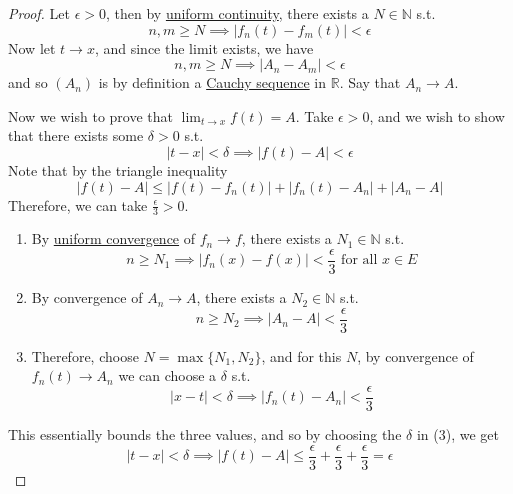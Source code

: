   \begin{proof}
    Let $\epsilon > 0$, then by \hyperref[def:uniform-continuity]{uniform continuity}, there exists a $N \in \mathbb{N}$ s.t. 
    \begin{equation}
      n, m \geq N \implies |f_n (t) - f_m (t)| < \epsilon
    \end{equation}
    Now let $t \to x$, and since the limit exists, we have 
    \begin{equation}
      n, m \geq N \implies |A_n - A_m| < \epsilon
    \end{equation} 
    and so $(A_n)$ is by definition a \hyperref[def:cauchy-sequence]{Cauchy sequence} in $\mathbb{R}$. Say that $A_n \to A$. 

    Now we wish to prove that $\lim_{t \to x} f(t) = A$. Take $\epsilon > 0$, and we wish to show that there exists some $\delta > 0$ s.t. 
    \begin{equation}
      |t - x| < \delta \implies |f(t) - A| < \epsilon
    \end{equation}
    Note that by the triangle inequality
    \begin{equation}
      |f(t) - A| \leq |f(t) - f_n (t)| + |f_n (t) - A_n| + |A_n - A|
    \end{equation}
    Therefore, we can take $\frac{\epsilon}{3} > 0$. 
    \begin{enumerate}
      \item By \hyperref[def:uniform-convergence]{uniform convergence} of $f_n \to f$, there exists a $N_1 \in \mathbb{N}$ s.t. 
      \begin{equation}
        n \geq N_1 \implies |f_n (x) - f(x)| < \frac{\epsilon}{3} \text{ for all } x \in E
      \end{equation}

      \item By convergence of $A_n \to A$, there exists a $N_2 \in \mathbb{N}$ s.t. 
      \begin{equation}
        n \geq N_2 \implies |A_n - A| < \frac{\epsilon}{3} 
      \end{equation}

      \item Therefore, choose $N = \max\{N_1, N_2\}$, and for this $N$, by convergence of $f_n (t) \to A_n$ we can choose a $\delta$ s.t. 
        \begin{equation}
          |x - t| < \delta \implies |f_n (t) - A_n| < \frac{\epsilon}{3} 
        \end{equation}
    \end{enumerate}
    This essentially bounds the three values, and so by choosing the $\delta$ in (3), we get 
    \begin{equation}
      |t - x| < \delta \implies |f(t) - A| \leq \frac{\epsilon}{3} + \frac{\epsilon}{3} + \frac{\epsilon}{3} = \epsilon
    \end{equation}
  \end{proof}

